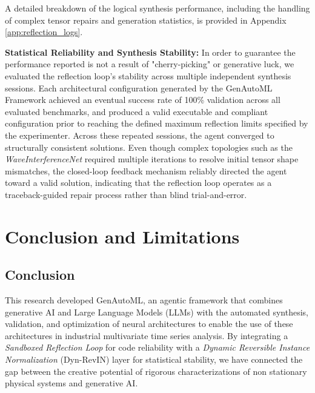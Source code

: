 \documentclass{article}
\begin{document}
A detailed breakdown of the logical synthesis performance, including the handling of complex tensor repairs and generation statistics, is provided in Appendix \ref{app:reflection_logs}.

\textbf{Statistical Reliability and Synthesis Stability:} In order to guarantee the performance reported is not a result of "cherry-picking" or generative luck, we evaluated the reflection loop's stability across multiple independent synthesis sessions. Each architectural configuration generated by the GenAutoML Framework achieved an eventual success rate of 100\% validation across all evaluated benchmarks, and produced a valid executable and compliant configuration prior to reaching the defined maximum reflection limits specified by the experimenter. Across these repeated sessions, the agent converged to structurally consistent solutions. Even though complex topologies such as the \textit{WaveInterferenceNet} required multiple iterations to resolve initial tensor shape mismatches, the closed-loop feedback mechanism reliably directed the agent toward a valid solution, indicating that the reflection loop operates as a traceback-guided repair process rather than blind trial-and-error.

\section{Conclusion and Limitations}
\label{sec:conclusion}

\subsection{Conclusion}
This research developed GenAutoML, an agentic framework that combines generative AI and Large Language Models (LLMs) with the automated synthesis, validation, and optimization of neural architectures to enable the use of these architectures in industrial multivariate time series analysis. By integrating a \textit{Sandboxed Reflection Loop} for code reliability with a \textit{Dynamic Reversible Instance Normalization} (Dyn-RevIN) layer for statistical stability, we have connected the gap between the creative potential of rigorous characterizations of non stationary physical systems and generative AI.
\end{document}

